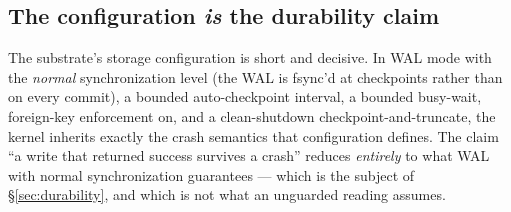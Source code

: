 \documentclass[11pt,a4paper]{article}
\theoremstyle{definition}
\theoremstyle{remark}
\begin{document}
\subsection{The configuration \emph{is} the durability claim}
\ifpdmargincolumn\pdcheckpointwindow\fi
The substrate's storage configuration is short and decisive. In WAL mode with
the \emph{normal} synchronization level (the WAL is fsync'd at checkpoints rather
than on every commit), a bounded auto-checkpoint interval, a bounded busy-wait,
foreign-key enforcement on, and a clean-shutdown checkpoint-and-truncate, the
kernel inherits exactly the crash semantics that configuration defines. The claim
``a write that returned success survives a crash'' reduces \emph{entirely} to what
WAL with normal synchronization guarantees --- which is the subject of
\S\ref{sec:durability}, and which is not what an unguarded reading assumes.
\end{document}
